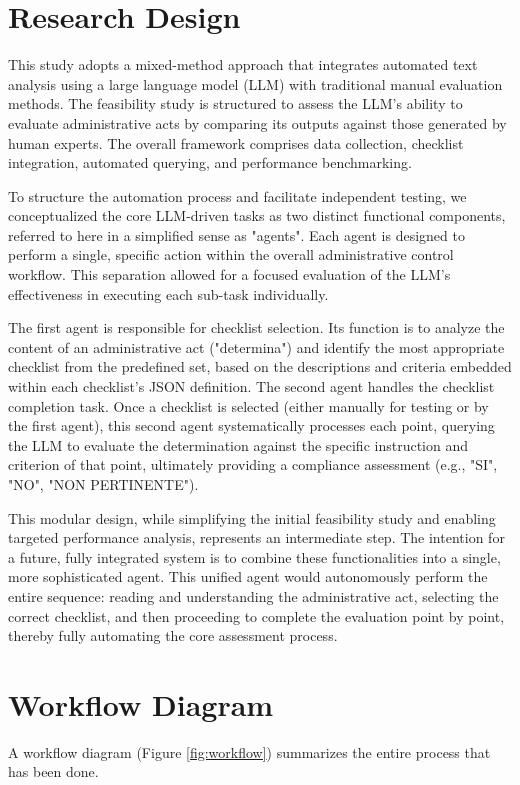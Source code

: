 \documentclass[../main.tex]{subfiles}
\begin{document}
\section{Research Design}
This study adopts a mixed-method approach that integrates automated text analysis using a large language model (LLM) with traditional manual evaluation methods. The feasibility study is structured to assess the LLM's ability to evaluate administrative acts by comparing its outputs against those generated by human experts. The overall framework comprises data collection, checklist integration, automated querying, and performance benchmarking. 

To structure the automation process and facilitate independent testing, we conceptualized the core LLM-driven tasks as two distinct functional components, referred to here in a simplified sense as "agents". Each agent is designed to perform a single, specific action within the overall administrative control workflow. This separation allowed for a focused evaluation of the LLM's effectiveness in executing each sub-task individually.

The first agent is responsible for checklist selection. Its function is to analyze the content of an administrative act ("determina") and identify the most appropriate checklist from the predefined set, based on the descriptions and criteria embedded within each checklist's JSON definition. The second agent handles the checklist completion task. Once a checklist is selected (either manually for testing or by the first agent), this second agent systematically processes each point, querying the LLM to evaluate the determination against the specific instruction and criterion of that point, ultimately providing a compliance assessment (e.g., "SI", "NO", "NON PERTINENTE").

This modular design, while simplifying the initial feasibility study and enabling targeted performance analysis, represents an intermediate step. The intention for a future, fully integrated system is to combine these functionalities into a single, more sophisticated agent. This unified agent would autonomously perform the entire sequence: reading and understanding the administrative act, selecting the correct checklist, and then proceeding to complete the evaluation point by point, thereby fully automating the core assessment process.

\section{Workflow Diagram}
A workflow diagram (Figure \ref{fig:workflow}) summarizes the entire process that has been done. 
\end{document}
